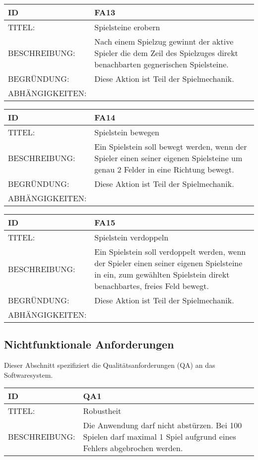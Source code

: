 \documentclass{uulm-assignment}
\begin{document}
\begin{tabularx}{16cm}{l|X}
\textbf{ID} & \textbf{FA13} \\
\hline
TITEL: & Spielsteine erobern \\
\hline
BESCHREIBUNG: & Nach einem Spielzug gewinnt der aktive Spieler die dem Zeil des Spielzuges direkt benachbarten gegnerischen Spielsteine.
\\
\hline
BEGRÜNDUNG: & Diese Aktion ist Teil der Spielmechanik. \\
\hline
ABHÄNGIGKEITEN: & \\
\end{tabularx}

\begin{tabularx}{16cm}{l|X}
\textbf{ID} & \textbf{FA14} \\
\hline
TITEL: & Spielstein bewegen \\
\hline
BESCHREIBUNG: & Ein Spielstein soll bewegt werden, wenn der Spieler einen seiner eigenen Spielsteine um genau 2 Felder in eine Richtung bewegt.
\\
\hline
BEGRÜNDUNG: & Diese Aktion ist Teil der Spielmechanik. \\
\hline
ABHÄNGIGKEITEN: & \\
\end{tabularx}

\begin{tabularx}{16cm}{l|X}
\textbf{ID} & \textbf{FA15} \\
\hline
TITEL: & Spielstein verdoppeln \\
\hline
BESCHREIBUNG: & Ein Spielstein soll verdoppelt werden, wenn der Spieler einen seiner eigenen Spielsteine in ein, zum gewählten Spielstein direkt benachbartes, freies Feld bewegt.
\\
\hline
BEGRÜNDUNG: & Diese Aktion ist Teil der Spielmechanik. \\
\hline
ABHÄNGIGKEITEN: & \\
\end{tabularx}

\subsection{Nichtfunktionale Anforderungen}

Dieser Abschnitt spezifiziert die Qualitätsanforderungen (QA) an das Softwaresystem.

\begin{tabularx}{16cm}{l|X}
\textbf{ID} & \textbf{QA1} \\
\hline
TITEL: & Robustheit \\
\hline
BESCHREIBUNG: & Die Anwendung darf nicht abstürzen. Bei 100 Spielen darf maximal 1 Spiel
aufgrund eines Fehlers abgebrochen werden. \\
\end{tabularx}
\end{document}
